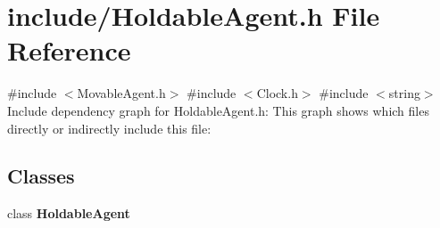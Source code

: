 \section{include/\+Holdable\+Agent.h File Reference}
\label{_holdable_agent_8h}
{\ttfamily \#include $<$Movable\+Agent.\+h$>$}\newline
{\ttfamily \#include $<$Clock.\+h$>$}\newline
{\ttfamily \#include $<$string$>$}\newline
Include dependency graph for Holdable\+Agent.\+h\+:
This graph shows which files directly or indirectly include this file\+:
\subsection*{Classes}
\begin{DoxyCompactItemize}
\item 
class \textbf{ Holdable\+Agent}
\end{DoxyCompactItemize}
